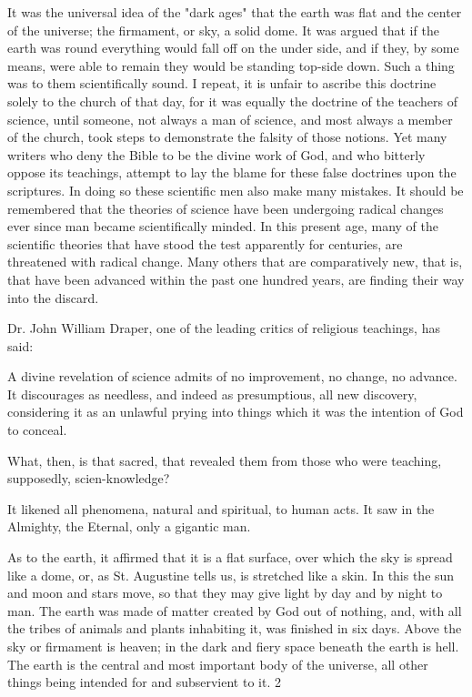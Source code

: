It was the universal idea of the "dark ages" that the earth was flat and the center of the
universe; the firmament, or sky, a solid dome. It was argued that if the earth was round
everything would fall off on the under side, and if they, by some means, were able to remain
they would be standing top-side down. Such a thing was to them scientifically sound. I
repeat, it is unfair to ascribe this doctrine solely to the church of that day, for it was equally
the doctrine of the teachers of science, until someone, not always a man of science, and most
always a member of the church, took steps to demonstrate the falsity of those notions. Yet
many writers who deny the Bible to be the divine work of God, and who bitterly oppose its
teachings, attempt to lay the blame for these false doctrines upon the scriptures. In doing so
these scientific men also make many mistakes. It should be remembered that the theories of
science have been undergoing radical changes ever since man became scientifically minded.
In this present age, many of the scientific theories that have stood the test apparently for
centuries, are threatened with radical change. Many others that are comparatively new, that
is, that have been advanced within the past one hundred years, are finding their way into the
discard.

Dr. John William Draper, one of the leading critics of religious teachings, has said:

A divine revelation of science admits of no improvement, no change, no advance. It
discourages as needless, and indeed as presumptious, all new discovery, considering it as an
unlawful prying into things which it was the intention of God to conceal.

What, then, is that sacred, that revealed them from those who were teaching, supposedly,
scien-knowledge?

It likened all phenomena, natural and spiritual, to human acts. It saw in the Almighty, the
Eternal, only a gigantic man.

As to the earth, it affirmed that it is a flat surface, over which the sky is spread like a dome,
or, as St. Augustine tells us, is stretched like a skin. In this the sun and moon and stars move,
so that they may give light by day and by night to man. The earth was made of matter created
by God out of nothing, and, with all the tribes of animals and plants inhabiting it, was
finished in six days. Above the sky or firmament is heaven; in the dark and fiery space
beneath the earth is hell. The earth is the central and most important body of the universe, all
other things being intended for and subservient to it. 2

